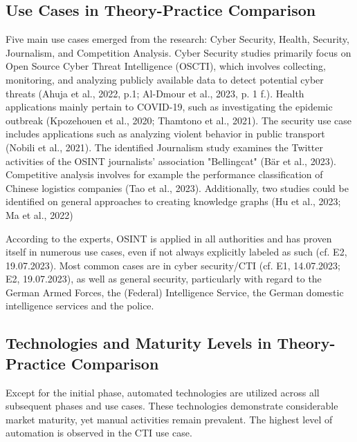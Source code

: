 \documentclass[10pt]{article}
\begin{document}
\subsection{Use Cases in Theory-Practice Comparison}

Five main use cases emerged from the research: Cyber Security, Health, Security, Journalism,
and Competition Analysis. Cyber Security studies primarily focus on Open Source Cyber Threat
Intelligence (OSCTI), which involves collecting, monitoring, and analyzing publicly available
data to detect potential cyber threats (Ahuja et al., 2022, p.1; Al-Dmour et al., 2023, p. 1 f.).
Health applications mainly pertain to COVID-19, such as investigating the epidemic outbreak
(Kpozehouen et al., 2020; Thamtono et al., 2021). The security use case includes applications such as
analyzing violent behavior in public transport (Nobili et al., 2021). The identified Journalism study examines the
Twitter activities of the OSINT journalists' association "Bellingcat" (Bär et al., 2023). Competitive analysis
involves for example the performance classification of Chinese logistics companies (Tao et al., 2023). Additionally, two
studies could be identified on general approaches to creating knowledge graphs (Hu et al., 2023; Ma et al., 2022)

According to the experts, OSINT is applied in all authorities and has proven itself
in numerous use cases, even if not always explicitly labeled as such (cf. E2, 19.07.2023).
Most common cases are in cyber security/CTI (cf. E1, 14.07.2023; E2, 19.07.2023), as well as general security,
particularly with regard to the German Armed Forces, the (Federal) Intelligence Service,
the Ger­man do­mes­tic in­tel­li­gence ser­vices and the police.

\subsection{Technologies and Maturity Levels in Theory-Practice Comparison}

Except for the initial phase, automated technologies are utilized across all subsequent phases and use cases.
These technologies demonstrate considerable market maturity, yet manual activities remain prevalent.
The highest level of automation is observed in the CTI use case.
\end{document}
